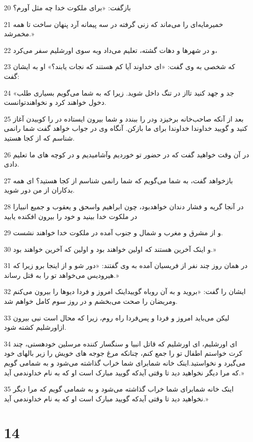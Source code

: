 \par 20 باز‌گفت: «برای ملکوت خدا چه مثل آورم؟
\par 21 خمیرمایه‌ای را می‌ماند که زنی گرفته در سه پیمانه آرد پنهان ساخت تا همه مخمرشد.»
\par 22 و در شهرها و دهات گشته، تعلیم می‌داد وبه سوی اورشلیم سفر می‌کرد،
\par 23 که شخصی به وی گفت: «ای خداوند آیا کم هستند که نجات یابند؟» او به ایشان گفت:
\par 24 «جد و جهد کنید تااز در تنگ داخل شوید. زیرا که به شما می‌گویم بسیاری طلب دخول خواهند کرد و نخواهندتوانست.
\par 25 بعد از آنکه صاحب‌خانه برخیزد ودر را ببندد و شما بیرون ایستاده در را کوبیدن آغاز کنید و گویید خداوندا خداوندا برای ما بازکن. آنگاه وی در جواب خواهد گفت شما رانمی شناسم که از کجا هستید.
\par 26 در آن وقت خواهید گفت که در حضور تو خوردیم وآشامیدیم و در کوچه های ما تعلیم دادی.
\par 27 بازخواهد گفت، به شما می‌گویم که شما رانمی شناسم از کجا هستید؟ ای همه بدکاران از من دور شوید.
\par 28 در آنجا گریه و فشار دندان خواهدبود، چون ابراهیم واسحق و یعقوب و جمیع انبیارا در ملکوت خدا بینید و خود را بیرون افکنده یابید
\par 29 و از مشرق و مغرب و شمال و جنوب آمده در ملکوت خدا خواهند نشست.
\par 30 و اینک آخرین هستند که اولین خواهند بود و اولین که آخرین خواهند بود.»
\par 31 در همان روز چند نفر از فریسیان آمده به وی گفتند: «دور شو و از اینجا برو زیرا که هیرودیس می‌خواهد تو را به قتل رساند.»
\par 32 ایشان را گفت: «بروید و به آن روباه گوییداینک امروز و فردا دیوها را بیرون می‌کنم ومریضان را صحت می‌بخشم و در روز سوم کامل خواهم شد.
\par 33 لیکن می‌باید امروز و فردا و پس‌فردا راه روم، زیرا که محال است نبی بیرون ازاورشلیم کشته شود.
\par 34 ‌ای اورشلیم، ای اورشلیم که قاتل انبیا و سنگسار کننده مرسلین خودهستی، چند کرت خواستم اطفال تو را جمع کنم، چنانکه مرغ جوجه های خویش را زیر بالهای خود می‌گیرد و نخواستید.اینک خانه شمابرای شما خراب گذاشته می‌شود و به شمامی گویم که مرا دیگر نخواهید دید تا وقتی آیدکه گویید مبارک است او که به نام خداوندمی آید.»
\par 35 اینک خانه شمابرای شما خراب گذاشته می‌شود و به شمامی گویم که مرا دیگر نخواهید دید تا وقتی آیدکه گویید مبارک است او که به نام خداوندمی آید.»

\chapter{14}


